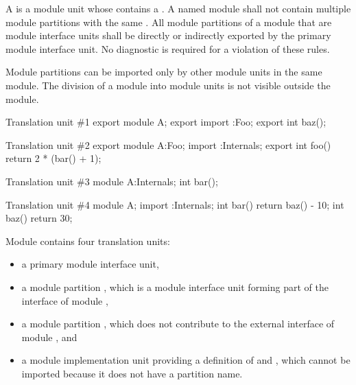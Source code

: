 \pnum
A  is
a module unit whose  contains
a .
A named module shall not contain multiple module partitions with
the same .
All module partitions of a module
that are module interface units
shall be directly or indirectly exported
by the primary module interface unit.
No diagnostic is required
for a violation of these rules.
\begin{note}
Module partitions can be imported only by
other module units in the same module.
The division of a module into module units
is not visible outside the module.
\end{note}

\pnum
\begin{example}
\begin{codeblocktu}{Translation unit \#1}
export module A;
export import :Foo;
export int baz();
\end{codeblocktu}

\begin{codeblocktu}{Translation unit \#2}
export module A:Foo;
import :Internals;
export int foo() { return 2 * (bar() + 1); }
\end{codeblocktu}

\begin{codeblocktu}{Translation unit \#3}
module A:Internals;
int bar();
\end{codeblocktu}

\begin{codeblocktu}{Translation unit \#4}
module A;
import :Internals;
int bar() { return baz() - 10; }
int baz() { return 30; }
\end{codeblocktu}

Module  contains four translation units:
\begin{itemize}
\item a primary module interface unit,
\item a module partition , which is a module interface unit
forming part of the interface of module ,
\item a module partition , which does not contribute
to the external interface of module , and
\item a module implementation unit providing
a definition of  and ,
which cannot be imported because
it does not have a partition name.
\end{itemize}
\end{example}

